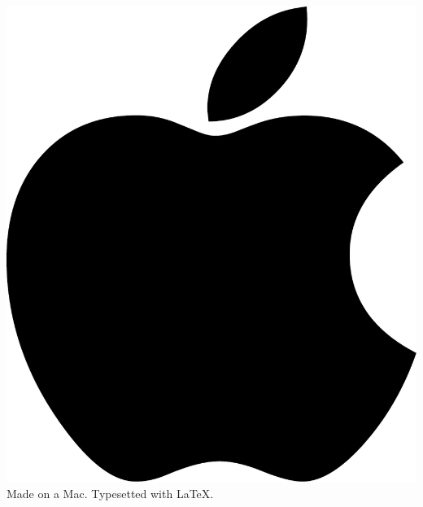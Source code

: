 
\newpage
\thispagestyle{empty}

% 
% 

\begin{center}
  \includegraphics[width=.08\textwidth]{images/apple.pdf}\\
  Made on a Mac. Typesetted with \LaTeX.
\end{center}
